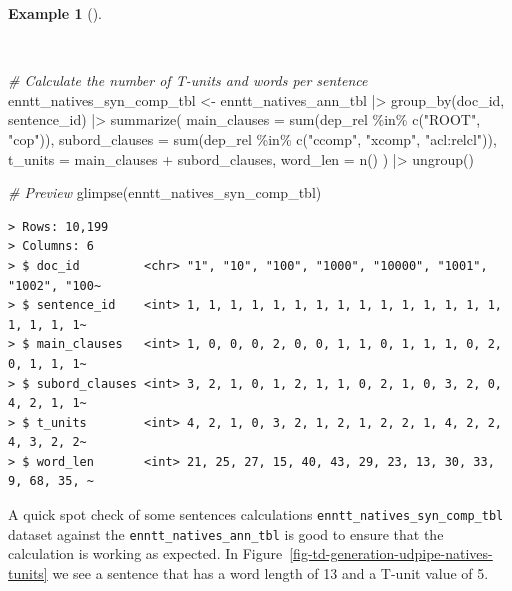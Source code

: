 \documentclass[
  letterpaper,
  DIV=11,
  numbers=noendperiod]{scrreprt}
\newenvironment{Shaded}{\begin{snugshade}}{\end{snugshade}}
\newcommand{\AttributeTok}[1]{\textcolor[rgb]{0.00,0.00,0.00}{#1}}
\newcommand{\CommentTok}[1]{\textcolor[rgb]{0.00,0.00,0.00}{\textit{#1}}}
\newcommand{\FunctionTok}[1]{\textcolor[rgb]{0.00,0.00,0.00}{#1}}
\newcommand{\NormalTok}[1]{\textcolor[rgb]{0.00,0.00,0.00}{#1}}
\newcommand{\OtherTok}[1]{\textcolor[rgb]{0.00,0.00,0.00}{#1}}
\newcommand{\SpecialCharTok}[1]{\textcolor[rgb]{0.00,0.00,0.00}{#1}}
\newcommand{\StringTok}[1]{\textcolor[rgb]{0.00,0.00,0.00}{#1}}
\theoremstyle{definition}
\newtheorem{example}{Example}[chapter]
\theoremstyle{remark}
\begin{document}
\begin{example}[]\protect\hypertarget{exm-td-generation-udpipe-natives-tunits-words}{}\label{exm-td-generation-udpipe-natives-tunits-words}

~

\begin{Shaded}
\begin{Highlighting}[]
\CommentTok{\# Calculate the number of T{-}units and words per sentence}
\NormalTok{enntt\_natives\_syn\_comp\_tbl }\OtherTok{\textless{}{-}}
\NormalTok{  enntt\_natives\_ann\_tbl }\SpecialCharTok{|\textgreater{}}
  \FunctionTok{group\_by}\NormalTok{(doc\_id, sentence\_id) }\SpecialCharTok{|\textgreater{}}
  \FunctionTok{summarize}\NormalTok{(}
    \AttributeTok{main\_clauses =} \FunctionTok{sum}\NormalTok{(dep\_rel }\SpecialCharTok{\%in\%} \FunctionTok{c}\NormalTok{(}\StringTok{"ROOT"}\NormalTok{, }\StringTok{"cop"}\NormalTok{)),}
    \AttributeTok{subord\_clauses =} \FunctionTok{sum}\NormalTok{(dep\_rel }\SpecialCharTok{\%in\%} \FunctionTok{c}\NormalTok{(}\StringTok{"ccomp"}\NormalTok{, }\StringTok{"xcomp"}\NormalTok{, }\StringTok{"acl:relcl"}\NormalTok{)),}
    \AttributeTok{t\_units =}\NormalTok{ main\_clauses }\SpecialCharTok{+}\NormalTok{ subord\_clauses,}
    \AttributeTok{word\_len =} \FunctionTok{n}\NormalTok{()}
\NormalTok{  ) }\SpecialCharTok{|\textgreater{}}
  \FunctionTok{ungroup}\NormalTok{()}

\CommentTok{\# Preview}
\FunctionTok{glimpse}\NormalTok{(enntt\_natives\_syn\_comp\_tbl)}
\end{Highlighting}
\end{Shaded}

\begin{verbatim}
> Rows: 10,199
> Columns: 6
> $ doc_id         <chr> "1", "10", "100", "1000", "10000", "1001", "1002", "100~
> $ sentence_id    <int> 1, 1, 1, 1, 1, 1, 1, 1, 1, 1, 1, 1, 1, 1, 1, 1, 1, 1, 1~
> $ main_clauses   <int> 1, 0, 0, 0, 2, 0, 0, 1, 1, 0, 1, 1, 1, 0, 2, 0, 1, 1, 1~
> $ subord_clauses <int> 3, 2, 1, 0, 1, 2, 1, 1, 0, 2, 1, 0, 3, 2, 0, 4, 2, 1, 1~
> $ t_units        <int> 4, 2, 1, 0, 3, 2, 1, 2, 1, 2, 2, 1, 4, 2, 2, 4, 3, 2, 2~
> $ word_len       <int> 21, 25, 27, 15, 40, 43, 29, 23, 13, 30, 33, 9, 68, 35, ~
\end{verbatim}

\end{example}

A quick spot check of some sentences calculations
\texttt{enntt\_natives\_syn\_comp\_tbl} dataset against the
\texttt{enntt\_natives\_ann\_tbl} is good to ensure that the calculation
is working as expected. In
Figure~\ref{fig-td-generation-udpipe-natives-tunits} we see a sentence
that has a word length of 13 and a T-unit value of 5.
\end{document}
